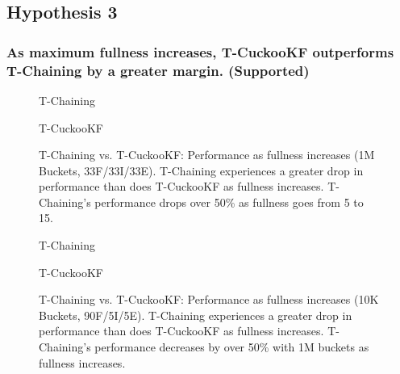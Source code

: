 \vspace{12pt}
\noindent{}

\subsection{Hypothesis 3}
\subsubsection{As maximum fullness increases, T-CuckooKF outperforms T-Chaining by a greater margin. (Supported)}

\begin{figure}[ht!]
    \centering
    \begin{minipage}{0.7\textwidth}
    \caption*{T-Chaining}
        \vspace{12pt}
    \end{minipage}
    \begin{minipage}{0.7\textwidth}
    \caption*{T-CuckooKF}
    \end{minipage}
    \caption[T-Chaining vs. T-CuckooKF: Performance as fullness increases (1M Buckets, 33F/33I/33E)]{T-Chaining vs. T-CuckooKF: Performance as fullness increases (1M Buckets, 33F/33I/33E). T-Chaining experiences a greater drop in performance than does T-CuckooKF as fullness increases. T-Chaining's performance drops over 50\% as fullness goes from 5 to 15.}
    \label{fig:hm_fullness_33_2}
\end{figure}

\begin{figure}[ht!]
    \centering
    \begin{minipage}{0.70\textwidth}
    \caption*{T-Chaining}
        \vspace{12pt}
    \end{minipage}
    \begin{minipage}{0.70\textwidth}
    \caption*{T-CuckooKF}
    \end{minipage}
    \caption[T-Chaining vs. T-CuckooKF: Performance as fullness increases (1M Buckets, 90F/5I/5E)]{T-Chaining vs. T-CuckooKF: Performance as fullness increases (10K Buckets, 90F/5I/5E). T-Chaining experiences a greater drop in performance than does T-CuckooKF as fullness increases. T-Chaining's performance decreases by over 50\% with 1M buckets as fullness increases.}
    \label{fig:hm_fullness_90_2}
\end{figure}


